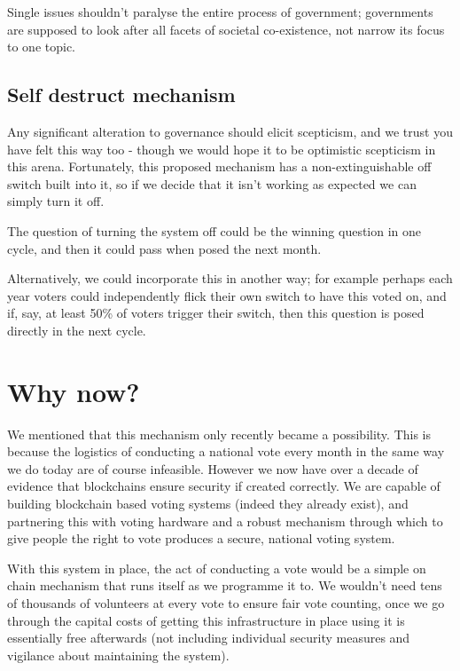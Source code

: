 \documentclass[twoside]{article}
\begin{document}
Single issues shouldn’t paralyse the entire process of government; governments are supposed to look after all facets of societal co-existence, not narrow its focus to one topic.

\subsection{Self destruct mechanism}

Any significant alteration to governance should elicit scepticism, and we trust you have felt this way too - though we would hope it to be optimistic scepticism in this arena. Fortunately, this proposed mechanism has a non-extinguishable off switch built into it, so if we decide that it isn’t working as expected we can simply turn it off.

The question of turning the system off could be the winning question in one cycle, and then it could pass when posed the next month.

Alternatively, we could incorporate this in another way; for example perhaps each year voters could independently flick their own switch to have this voted on, and if, say, at least 50\% of voters trigger their switch, then this question is posed directly in the next cycle.

\section{Why now?}

We mentioned that this mechanism only recently became a possibility. This is because the logistics of conducting a national vote every month in the same way we do today are of course infeasible. However we now have over a decade of evidence that blockchains ensure security if created correctly. We are capable of building blockchain based voting systems (indeed they already exist), and partnering this with voting hardware and a robust mechanism through which to give people the right to vote produces a secure, national voting system.

With this system in place, the act of conducting a vote would be a simple on chain mechanism that runs itself as we programme it to. We wouldn’t need tens of thousands of volunteers at every vote to ensure fair vote counting, once we go through the capital costs of getting this infrastructure in place using it is essentially free afterwards (not including individual security measures and vigilance about maintaining the system). 
\end{document}
